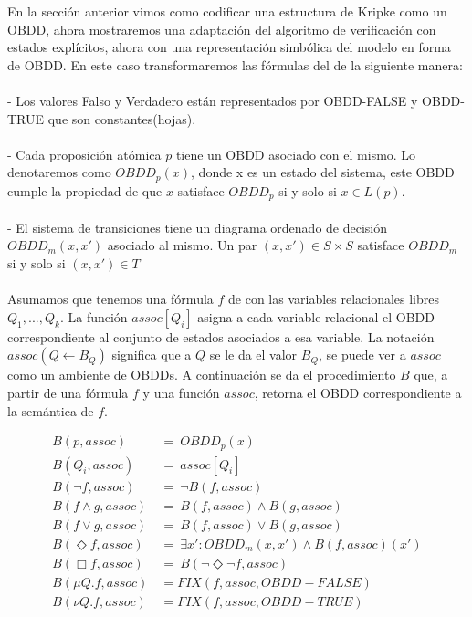 En la sección anterior vimos como codificar una estructura de Kripke como un OBDD, ahora mostraremos una adaptación del algoritmo de verificación con estados explícitos, ahora con una representación simbólica del modelo en forma de OBDD. En este caso transformaremos las fórmulas del {\mucalculo} de la siguiente manera\cite{Clarke:1}: \\
\\
- Los valores Falso y Verdadero están representados por OBDD-FALSE y OBDD-TRUE que son constantes(hojas).\\
\\
- Cada proposición atómica $p$ tiene un OBDD asociado con el mismo. Lo denotaremos como $OBDD_{p}(x)$, donde x es un estado del sistema, este OBDD cumple la propiedad de que $x$ satisface $OBDD_{p}$ si y solo si $x \in L(p)$. \\
\\
- El sistema de transiciones tiene un diagrama ordenado de decisión $OBDD_{m}(x,x')$ asociado al mismo. Un par $(x,x') \in S \times S$ satisface $OBDD_{m}$ si y solo si $(x,x') \in T$ \\
\\
Asumamos que tenemos una fórmula $f$ de {\mucalculo} con las variables relacionales libres $Q_{1},...,Q_{k}$. La función $assoc[Q_{i}]$ asigna a cada variable relacional el OBDD correspondiente al conjunto de estados asociados a esa variable. La notación $assoc(Q \gets B_{Q})$ significa que a $Q$ se le da el valor $B_{Q}$, se puede ver a $assoc$ como un ambiente de OBDDs. A continuación se da el procedimiento $B$ que, a partir de una fórmula $f$ y una función $assoc$, retorna el OBDD correspondiente a la semántica de $f$.

\begin{align*}
 B(p,assoc)\ &=\ OBDD_{p}(x) \\
 B(Q_{i},assoc)\ &=\ assoc[Q_{i}] \\
 B(\neg f,assoc)\ &=\ \neg B(f,assoc) \\
 B(f \land g,assoc)\ &=\ B(f,assoc) \land B(g,assoc) \\
 B(f \lor g,assoc)\ &=\ B(f,assoc) \lor B(g,assoc) \\
 B(\Diamond f,assoc)\ &=\ \exists x' : OBDD_{m}(x,x') \land B(f,assoc)(x') \\
 B(\Box f,assoc)\ &=\ B(\neg \Diamond \neg f, assoc) \\
 B(\mu Q. f, assoc) &= FIX(f,assoc,OBDD-FALSE) \\
 B(\nu Q. f, assoc) &= FIX(f,assoc,OBDD-TRUE) \\
\end{align*}

